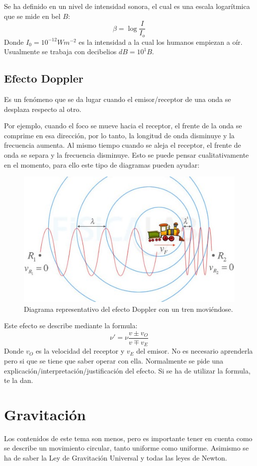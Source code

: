 \documentclass[arial,a4paper,print]{article}
\begin{document}
Se ha definido en un nivel de intensidad sonora, el cual es una escala logarítmica que se mide en bel $\si{B}$:
\begin{equation*}
	\beta = \log\frac{I}{I_{o}}
\end{equation*}
Donde $I_{0} = 10^{-12} \si{Wm^{-2}}$ es la intensidad a la cual los humanos empiezan a oír.
Usualmente se trabaja con decibelios $\si{dB} = 10^1\si{B}$.

\subsection{Efecto Doppler}
Es un fenómeno que se da lugar cuando el emisor/receptor de una onda se desplaza respecto al otro.

Por ejemplo, cuando el foco se mueve hacia el receptor, el frente de la onda se comprime en esa dirección, por lo tanto, la longitud de onda disminuye y la frecuencia aumenta. Al mismo tiempo cuando se aleja el receptor, el frente de onda se separa y la frecuencia disminuye. Esto se puede pensar cualitativamente en el momento, para ello este tipo de diagramas pueden ayudar:
\begin{figure}[h]
	\centering
	\includegraphics[width=0.5\linewidth]{figures/efecto-doppler-2}
	\caption{Diagrama representativo del efecto Doppler con un tren moviéndose.}
	\label{fig:efecto-doppler-2}
\end{figure}

Este efecto se describe mediante la formula:
\begin{equation*}
	\nu' = \nu\frac{v\pm v_{O}}{v\mp v_{E}}
\end{equation*}
Donde $v_{O}$ es la velocidad del receptor y $v_{E}$ del emisor. 
No es necesario aprenderla pero si que se tiene que saber operar con ella. Normalmente se pide una explicación/interpretación/justificación del efecto. Si se ha de utilizar la formula, te la dan. 
\pagebreak

\section{Gravitación}
Los contenidos de este tema son menos, pero es importante tener en cuenta como se describe un movimiento circular, tanto uniforme como uniforme. Asimismo se ha de saber la Ley de Gravitación Universal y todas las leyes de Newton. 
\end{document}
